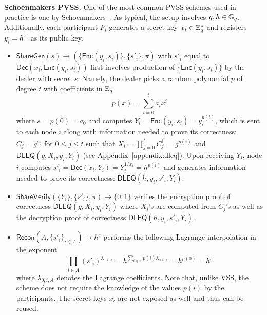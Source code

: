 \noindent\textbf{Schoenmakers PVSS.}
\label{appendix:schoenmakersPVSS}
One of the most common PVSS schemes used in practice is one by Schoenmakers~\cite{schoenmakers1999simple}. As typical, the setup involves $g, h \in \mathbb{G}_q$. Additionally, each participant $P_i$ generates a secret key $x_i \in \mathbb{Z}^*_q$ and registers $y_i = h^{x_i}$ as its public key.

\begin{itemize}
\item $\mathsf{ShareGen}(s) \rightarrow (\{\mathsf{Enc}(y_i, s_i)\}, \{s'_i\}, \pi)$ with $s'_i$ equal to $\mathsf{Dec}(x_i, \mathsf{Enc}(y_i, s_i))$ first involves production of $\{\mathsf{Enc}(y_i, s_i)\}$ by the dealer with secret $s$. Namely, the dealer picks a random polynomial $p$ of degree $t$ with coefficients in $\mathbb{Z}_q$
\[
p(x) = \sum_{i = 0}^{t} a_i x^i
\]
where $s = p(0) = a_0$ and computes $Y_i = \mathsf{Enc}(y_i, s_i) = y_i^{p(i)}$, which is sent to each node $i$ along with information needed to prove its correctness: $C_j = g^{a_j}$ for $0 \leq j \leq t$ such that $X_i = \prod_{j = 0}^{t} C_j^{i^j} = g^{p(i)}$ and $\mathsf{DLEQ}(g, X_i, y_i, Y_i)$ (see Appendix~\ref{appendix:dleq}). Upon receiving $Y_i$, node $i$ computes $s'_i = \mathsf{Dec}(x_i, Y_i) = Y_i^{1 / x_i} = h^{p(i)}$ and generates information needed to prove its correctness: $\mathsf{DLEQ}(h, y_i, s'_i, Y_i)$.
\item $\mathsf{ShareVerify}(\{Y_i\}, \{s'_i\}, \pi) \rightarrow \{0, 1\}$ verifies the encryption proof of correctness $\mathsf{DLEQ}(g, X_i, y_i, Y_i)$ where $X_i$'s are computed from $C_j$'s as well as the decryption proof of correctness $\mathsf{DLEQ}(h, y_i, s'_i, Y_i)$.
\item $\mathsf{Recon}(A, \{s'_i\}_{i \in A}) \rightarrow h^s$ performs the following Lagrange interpolation in the exponent
\[
\prod_{i \in A} (s'_i)^{\lambda_{0, i, A}} = h^{\sum_{i \in A} p(i) \lambda_{0, i, A}} = h^{p(0)} = h^s
\]
where $\lambda_{0, i, A}$ denotes the Lagrange coefficients. Note that, unlike VSS, the scheme does not require the knowledge of the values $p(i)$ by the participants. The secret keys $x_i$ are not exposed as well and thus can be reused.
\end{itemize}


